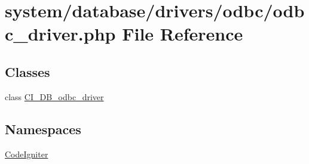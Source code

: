\hypertarget{odbc__driver_8php}{}\section{system/database/drivers/odbc/odbc\+\_\+driver.php File Reference}
\label{odbc__driver_8php}
\subsection*{Classes}
\begin{DoxyCompactItemize}
\item 
class \mbox{\hyperlink{class_c_i___d_b__odbc__driver}{C\+I\+\_\+\+D\+B\+\_\+odbc\+\_\+driver}}
\end{DoxyCompactItemize}
\subsection*{Namespaces}
\begin{DoxyCompactItemize}
\item 
 \mbox{\hyperlink{namespace_code_igniter}{Code\+Igniter}}
\end{DoxyCompactItemize}
